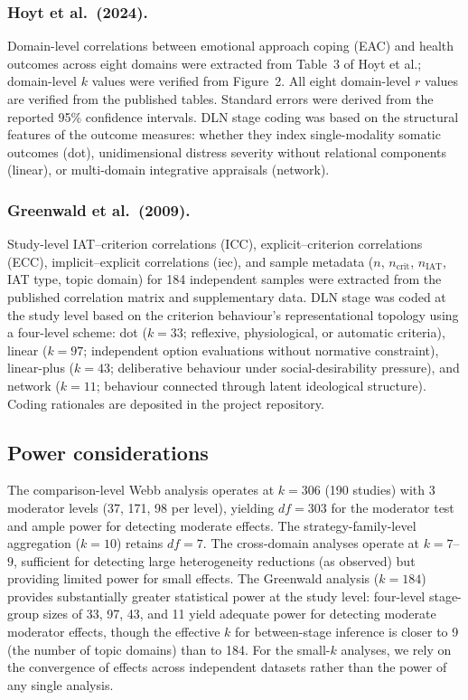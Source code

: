 \documentclass[11pt]{article}
\begin{document}
\subsubsection*{Hoyt et al.\ (2024).}
Domain-level correlations between emotional approach coping (EAC) and
health outcomes across eight domains were extracted from Table~3 of
Hoyt et al.\cite{Hoyt2024}; domain-level $k$ values were verified from
Figure~2. All eight domain-level $r$ values are verified from the
published tables. Standard errors were derived from the reported 95\%
confidence intervals. DLN stage coding was based on the structural features of the outcome
measures: whether they index single-modality somatic outcomes (dot),
unidimensional distress severity without relational components
(linear), or multi-domain integrative appraisals (network).

\subsubsection*{Greenwald et al.\ (2009).}
Study-level IAT--criterion correlations (ICC), explicit--criterion
correlations (ECC), implicit--explicit correlations (iec), and sample
metadata ($n$, $n_\mathrm{crit}$, $n_\mathrm{IAT}$, IAT type, topic
domain) for 184 independent samples were extracted from the published
correlation matrix and supplementary data. DLN stage was coded at the
study level based on the criterion behaviour's representational
topology using a four-level scheme: dot ($k = 33$; reflexive,
physiological, or automatic criteria), linear ($k = 97$; independent
option evaluations without normative constraint), linear-plus
($k = 43$; deliberative behaviour under social-desirability pressure),
and network ($k = 11$; behaviour connected through latent ideological
structure). Coding rationales are deposited in the project repository.


\subsection{Power considerations}

The comparison-level Webb analysis operates at $k = 306$ (190 studies)
with 3 moderator levels (37, 171, 98 per level), yielding $df = 303$
for the moderator test and ample power for detecting moderate effects.
The strategy-family-level aggregation ($k = 10$) retains $df = 7$.
The cross-domain analyses operate at $k = 7$--$9$, sufficient
for detecting large heterogeneity reductions (as observed) but providing
limited power for small effects. The Greenwald analysis ($k = 184$)
provides substantially greater statistical power at the study level:
four-level stage-group sizes of 33, 97, 43, and 11 yield adequate
power for detecting moderate moderator effects, though the effective
$k$ for between-stage inference is closer to 9 (the number of topic
domains) than to 184. For the small-$k$ analyses, we rely on the convergence of
effects across independent datasets rather than the power of any single
analysis.
\end{document}
